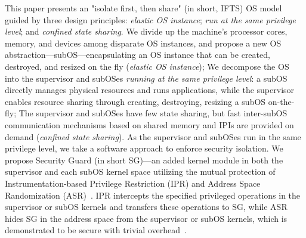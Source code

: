 \documentclass[pageno]{jpaper}
\begin{document}
This paper presents an "isolate first, then share" (in short, IFTS) OS model guided by three design principles: \emph{elastic OS instance}; \emph{run at the
same privilege level}; and\emph{ confined state sharing}.
We divide up the machine's processor cores, memory, and devices among disparate OS instances,
and propose a new OS abstraction---subOS---encapsulating an OS instance that can be created, destroyed, and resized on the fly (\emph{elastic OS instance});
We decompose the OS into the supervisor and subOSes \emph{running at the same privilege level}:  a subOS  directly  manages physical resources and runs applications, while the supervisor enables resource sharing through creating, destroying, resizing a subOS on-the-fly; The supervisor and subOSes have few state sharing, but fast inter-subOS communication mechanisms based on shared memory and IPIs are provided on demand (\emph{confined state sharing}).
As the supervisor and subOSes run in the same privilege level, we take a software approach to enforce security isolation.
We propose Security Guard (in short SG)---an added kernel module in both the supervisor and each subOS kernel space utilizing the mutual protection of Instrumentation-based Privilege Restriction (IPR) and Address Space Randomization (ASR)~\cite{Deng:2017:DWT}.   IPR intercepts the specified privileged
operations in the supervisor or subOS kernels and transfers these operations to
SG, while ASR hides SG in the address
space from the supervisor or subOS kernels, which is demonstrated to be secure with trivial overhead~\cite{Deng:2017:DWT}.
\end{document}
